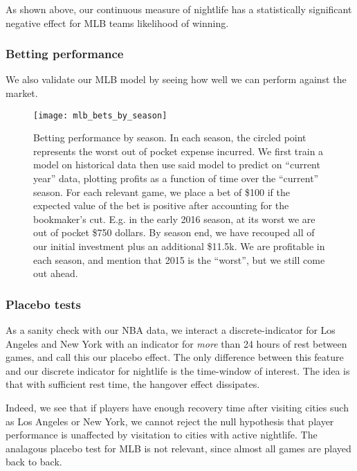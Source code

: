 \documentclass[letterpaper,12pt]{article}
\begin{document}
As shown above, our continuous measure of nightlife has a statistically significant negative effect for MLB teams likelihood of winning.

\subsubsection{Betting performance}
We also validate our MLB model by seeing how well we can perform against the
market.
\begin{figure}[!h]
  \centering
  \label{mlb bets by season}
  \texttt{[image: mlb\_bets\_by\_season]}
  \caption{Betting performance by season. In each season, the 
    circled point represents the worst out of pocket expense incurred.
    We first train a model on historical data then use said model to predict on ``current year''
    data, plotting profits as a function of time over the ``current'' season. For each relevant
    game, we place a bet of \$100 if the expected value of the bet is positive after accounting for the bookmaker's cut. E.g. in the     early 2016 season,
    at its worst we are out of pocket \$750 dollars. By season end, we have     recouped all of
    our initial investment plus an additional \$11.5k. We are profitable in each season, and mention that 2015 is the ``worst'', but we still come out ahead.}
  \label{bettingperf}
\end{figure}

\subsubsection{Placebo tests} As a sanity check with our NBA data, we interact a
discrete-indicator for Los Angeles and New York with an 
indicator for \emph{more} than 24 hours of rest
between games, and call this our placebo effect. The only difference between this feature
and our discrete indicator for nightlife is the time-window of interest.
The idea is that with sufficient rest time, the hangover effect dissipates.

Indeed, we see that if players have enough recovery time after visiting cities such as Los
Angeles or New York, we cannot reject the null hypothesis that player performance is unaffected
by visitation to cities with active nightlife. The analagous placebo test
for MLB is not relevant, since almost all games are played back to back.
\end{document}
